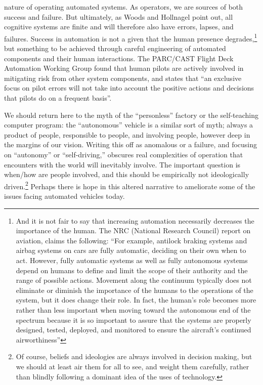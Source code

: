 nature of operating automated
systems\cite[p. ??]{???-woodshollnagel-JCS-ch1}. As operators, we are
sources of both success and failure. But ultimately, as Woods and
Hollnagel point out, all cognitive systems are finite and will
therefore also have errors, lapses, and
failures\cite[p. ??]{???-woodshollnagel}. Success in automation is not
a given that the human presence degrades,\footnote{And it is not fair
  to say that increasing automation necessarily decreases the
  importance of the human. The NRC (National
  Research Council) report on aviation, claims the following: 
``For example, antilock braking systems and airbag systems on cars are
fully automatic, deciding on their own when to act. However, fully
automatic systems as well as fully
autonomous systems depend on humans to define and limit the scope of
their authority and the range of possible actions. Movement along the
continuum typically does not eliminate or diminish the importance
of the humans to the operations of the system, but it does change
their role. In fact, the human's role
becomes more rather than less important when moving toward the
autonomous end of the spectrum
because it is so important to assure that the systems are
properly designed, tested, deployed, and monitored to ensure the
aircraft's continued airworthiness''\cite[p. 14-15]{???-NRCaviation}}
but something to be  
achieved through careful engineering of automated components and their
human interactions. The PARC/CAST Flight Deck Automation Working Group
found that human pilots are actively involved in mitigating risk from
other system components, and states that ``an exclusive focus on pilot
errors will not take into account the positive actions and decisions
that pilots do on a frequent basis''\cite[p. 30]{???-PARC/CAST}. 

We should return here to the myth of the ``personless'' factory or the
self-teaching computer program: the ``autonomous'' vehicle is a
similar sort of myth; always a 
product of people, responsible to people, and involving people,
however deep in the margins of our vision. Writing this off as
anomalous or a failure, and focusing on ``autonomy'' or ``self-driving,''
obscures real complexities of operation that encounters with the world
will inevitably involve. The important question is when/how are people
involved, and this should be empirically not ideologically
driven.\footnote{Of course, beliefs and ideologies are always involved
  in decision making, but we should at least air them for all to see,
  and weight them carefully, rather than blindly following a dominant
  idea of the uses of technology.}
Perhaps there is hope in this altered narrative to ameliorate some of
the issues facing automated vehicles today. 

